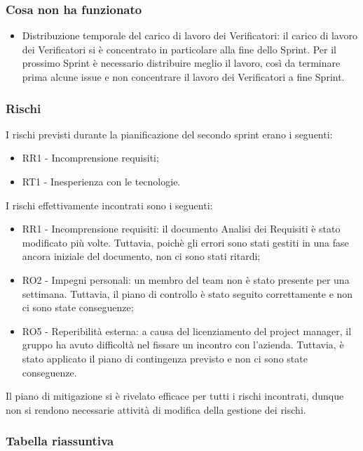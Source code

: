 \documentclass[12pt]{article}
\begin{document}
	\subsubsection{Cosa non ha funzionato}
	\begin{itemize}
		\item Distribuzione temporale del carico di lavoro dei Verificatori: il carico di lavoro dei Verificatori si è concentrato in particolare alla fine dello Sprint. Per il prossimo Sprint è necessario distribuire meglio il lavoro, così da terminare prima alcune issue e non concentrare il lavoro dei Verificatori a fine Sprint.
	\end{itemize}


	\subsubsection{Rischi}
	I rischi previsti durante la pianificazione del secondo sprint erano i seguenti: 
	\begin{itemize}
		\item RR1 - Incomprensione requisiti;
		\item RT1 - Inesperienza con le tecnologie.
	\end{itemize}
	I rischi effettivamente incontrati sono i seguenti:
	\begin{itemize}
		\item RR1 - Incomprensione requisiti: il documento Analisi dei Requisiti è stato modificato più volte. Tuttavia, poichè gli errori sono stati gestiti in una fase ancora iniziale del documento, non ci sono stati ritardi;
		\item RO2 - Impegni personali: un membro del team non è stato presente per una settimana. Tuttavia, il piano di controllo è stato seguito correttamente e non ci sono state conseguenze;
		\item RO5 - Reperibilità esterna: a causa del licenziamento del project manager, il gruppo ha avuto difficoltà nel fissare un incontro con l'azienda. Tuttavia, è stato applicato il piano di contingenza previsto e non ci sono state conseguenze.
	\end{itemize}
	Il piano di mitigazione si è rivelato efficace per tutti i rischi incontrati, dunque non si rendono necessarie attività di modifica della gestione dei rischi.

	\subsubsection{Tabella riassuntiva}
\end{document}

